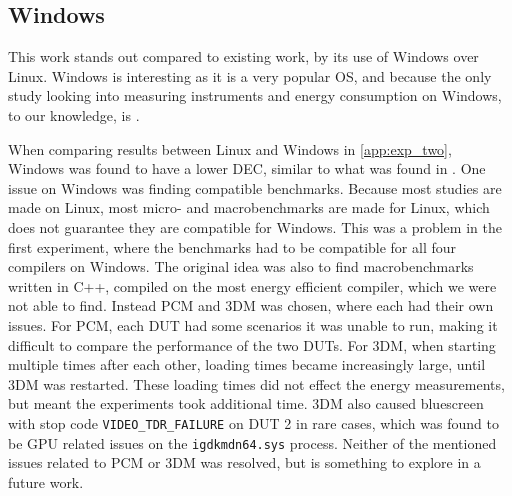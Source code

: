 \subsection{Windows}

This work stands out compared to existing work, by its use of Windows over Linux\cite{khan2018rapl, georgiou2020energy, pereira2017}. Windows is interesting as it is a very popular OS, and because the only study looking into measuring instruments and energy consumption on Windows, to our knowledge, is \cite{biksbois}.

When comparing results between Linux and Windows in \cref{app:exp_two}, Windows was found to have a lower DEC, similar to what was found in \cite{biksbois}. One issue on Windows was finding compatible benchmarks. Because most studies are made on Linux, most micro- and macrobenchmarks are made for Linux, which does not guarantee they are compatible for Windows. This was a problem in the first experiment, where the benchmarks had to be compatible for all four compilers on Windows. The original idea was also to find macrobenchmarks written in C++, compiled on the most energy efficient compiler, which we were not able to find. Instead PCM and 3DM was chosen, where each had their own issues. For PCM, each DUT had some scenarios it was unable to run, making it difficult to compare the performance of the two DUTs. For 3DM, when starting multiple times after each other, loading times became increasingly large, until 3DM was restarted. These loading times did not effect the energy measurements, but meant the experiments took additional time. 3DM also caused bluescreen with stop code \texttt{VIDEO\_TDR\_FAILURE} on DUT 2 in rare cases, which was found to be GPU related issues on the \texttt{igdkmdn64.sys} process. Neither of the mentioned issues related to PCM or 3DM was resolved, but is something to explore in a future work.



